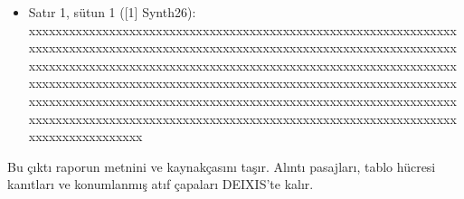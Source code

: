 \documentclass[journal]{IEEEtran}
\begin{document}
\begin{itemize}
\item[1.] Satır 1, sütun 1 ([1] Synth26): xxxxxxxxxxxxxxxxxxxxxxxxxxxxxxxxxxxxxxxxxxxxxxxxxxxxxxxxxxxxxxxxxxxxxxxxxxxxxxxxxxxxxxxxxxxxxxxxxxxxxxxxxxxxxxxxxxxxxxxxxxxxxxxxxxxxxxxxxxxxxxxxxxxxxxxxxxxxxxxxxxxxxxxxxxxxxxxxxxxxxxxxxxxxxxxxxxxxxxxxxxxxxxxxxxxxxxxxxxxxxxxxxxxxxxxxxxxxxxxxxxxxxxxxxxxxxxxxxxxxxxxxxxxxxxxxxxxxxxxxxxxxxxxxxxxxxxxxxxxxxxxxxxxxxxxxxxxxxxxxxxxxxxxxxxxxxxxxxxxxxxxxxxxxxxxxxxxxxxxxxxxxxxxxxxxxxxxxxxxxxxxxxxxxxxxxxxxxxxxxx
\end{itemize}

Bu çıktı raporun metnini ve kaynakçasını taşır. Alıntı pasajları, tablo hücresi kanıtları ve konumlanmış atıf çapaları DEIXIS'te kalır.




\end{document}
